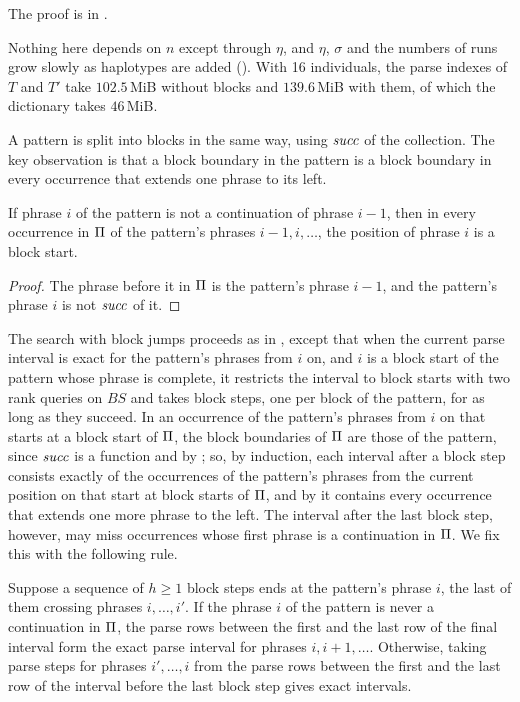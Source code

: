 The proof is in .

Nothing here depends on $n$ except through $\eta$, and $\eta$,
$\sigma$ and the numbers of runs grow slowly as haplotypes are added
(). With 16 individuals, the parse indexes of $T$
and $T'$ take $102.5$\,MiB without blocks and $139.6$\,MiB with them,
of which the dictionary takes $46$\,MiB.

A pattern is split into blocks in the same way, using $\mathit{succ}$ of the
collection. The key observation is that a block boundary in the
pattern is a block boundary in every occurrence that extends one
phrase to its left.

\begin{lemma}
\label{lem:blockstart}
If phrase $i$ of the pattern is not a continuation of phrase $i - 1$,
then in every occurrence in $\Pi$ of the pattern's phrases $i - 1, i,
\ldots$, the position of phrase $i$ is a block start.
\end{lemma}

\begin{proof}
The phrase before it in $\Pi$ is the pattern's phrase $i - 1$, and the
pattern's phrase $i$ is not $\mathit{succ}$ of it.
\end{proof}

The search with block jumps proceeds as in , except
that when the current parse interval is exact for the pattern's
phrases from $i$ on, and $i$ is a block start of the pattern whose
phrase is complete, it restricts the interval to block starts with two
rank queries on $BS$ and takes block steps, one per block of the
pattern, for as long as they succeed. In an occurrence of the pattern's
phrases from $i$ on that starts at a block start of $\Pi$, the block
boundaries of $\Pi$ are those of the pattern, since $\mathit{succ}$ is a
function and by ; so, by induction, each interval
after a block step consists exactly of the occurrences of the pattern's
phrases from the current position on that start at block starts of
$\Pi$, and by  it contains every occurrence that
extends one more phrase to the left. The interval after the last block
step, however, may miss occurrences whose first phrase is a
continuation in $\Pi$. We fix this with the following rule.

\begin{lemma}
\label{lem:backup}
Suppose a sequence of $h \ge 1$ block steps ends at the pattern's
phrase $i$, the last of them crossing phrases $i, \ldots, i'$. If the
phrase $i$ of the pattern is never a continuation in $\Pi$, the parse
rows between the first and the last row of the final interval form
the exact parse interval for phrases $i, i+1, \ldots$. Otherwise,
taking parse steps for phrases $i', \ldots, i$ from the parse rows
between the first and the last row of the interval before the last
block step gives exact intervals.
\end{lemma}

